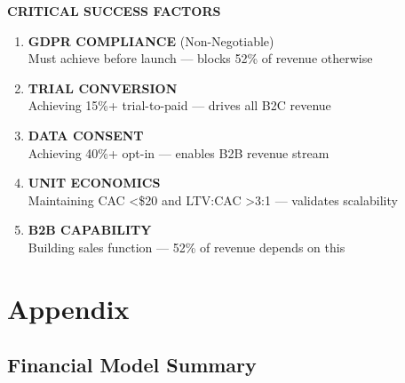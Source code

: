 \documentclass[11pt,a4paper]{article}
\begin{document}
\begin{accentbox}
\begin{center}
{\Large\bfseries\textcolor{miloaccent}{CRITICAL SUCCESS FACTORS}}
\end{center}

\vspace{10pt}

\begin{enumerate}[leftmargin=20pt, itemsep=8pt]
    \item \textbf{GDPR COMPLIANCE} (Non-Negotiable)\\
    {\small Must achieve before launch --- blocks 52\% of revenue otherwise}

    \item \textbf{TRIAL CONVERSION}\\
    {\small Achieving 15\%+ trial-to-paid --- drives all B2C revenue}

    \item \textbf{DATA CONSENT}\\
    {\small Achieving 40\%+ opt-in --- enables B2B revenue stream}

    \item \textbf{UNIT ECONOMICS}\\
    {\small Maintaining CAC <\$20 and LTV:CAC >3:1 --- validates scalability}

    \item \textbf{B2B CAPABILITY}\\
    {\small Building sales function --- 52\% of revenue depends on this}
\end{enumerate}
\end{accentbox}

\newpage

\section{Appendix}

\subsection{Financial Model Summary}
\end{document}
